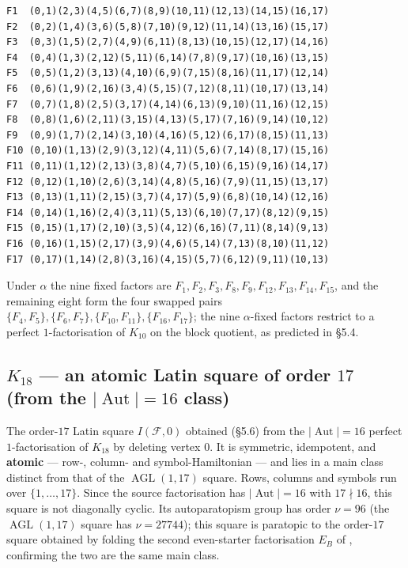\documentclass[11pt,reqno]{amsart}
\theoremstyle{plain}
\theoremstyle{definition}
\numberwithin{theorem}{section}
\newcommand{\Aut}{\operatorname{Aut}}
\newcommand{\AGL}{\operatorname{AGL}}
\begin{document}
{\footnotesize\begin{verbatim}
F1  (0,1)(2,3)(4,5)(6,7)(8,9)(10,11)(12,13)(14,15)(16,17)
F2  (0,2)(1,4)(3,6)(5,8)(7,10)(9,12)(11,14)(13,16)(15,17)
F3  (0,3)(1,5)(2,7)(4,9)(6,11)(8,13)(10,15)(12,17)(14,16)
F4  (0,4)(1,3)(2,12)(5,11)(6,14)(7,8)(9,17)(10,16)(13,15)
F5  (0,5)(1,2)(3,13)(4,10)(6,9)(7,15)(8,16)(11,17)(12,14)
F6  (0,6)(1,9)(2,16)(3,4)(5,15)(7,12)(8,11)(10,17)(13,14)
F7  (0,7)(1,8)(2,5)(3,17)(4,14)(6,13)(9,10)(11,16)(12,15)
F8  (0,8)(1,6)(2,11)(3,15)(4,13)(5,17)(7,16)(9,14)(10,12)
F9  (0,9)(1,7)(2,14)(3,10)(4,16)(5,12)(6,17)(8,15)(11,13)
F10 (0,10)(1,13)(2,9)(3,12)(4,11)(5,6)(7,14)(8,17)(15,16)
F11 (0,11)(1,12)(2,13)(3,8)(4,7)(5,10)(6,15)(9,16)(14,17)
F12 (0,12)(1,10)(2,6)(3,14)(4,8)(5,16)(7,9)(11,15)(13,17)
F13 (0,13)(1,11)(2,15)(3,7)(4,17)(5,9)(6,8)(10,14)(12,16)
F14 (0,14)(1,16)(2,4)(3,11)(5,13)(6,10)(7,17)(8,12)(9,15)
F15 (0,15)(1,17)(2,10)(3,5)(4,12)(6,16)(7,11)(8,14)(9,13)
F16 (0,16)(1,15)(2,17)(3,9)(4,6)(5,14)(7,13)(8,10)(11,12)
F17 (0,17)(1,14)(2,8)(3,16)(4,15)(5,7)(6,12)(9,11)(10,13)
\end{verbatim}}

Under $\alpha$ the nine fixed factors are
$F_1,F_2,F_3,F_8,F_9,F_{12},F_{13},F_{14},F_{15}$, and the remaining eight form the four
swapped pairs $\{F_4,F_5\},\{F_6,F_7\},\{F_{10},F_{11}\},\{F_{16},F_{17}\}$; the nine
$\alpha$-fixed factors restrict to a perfect $1$-factorisation of $K_{10}$ on the block
quotient, as predicted in \S5.4.

\subsection{$K_{18}$ --- an atomic Latin square of order $17$ (from the $|\Aut|=16$ class)}

The order-$17$ Latin square $I(\mathcal F,0)$ obtained (\S5.6) from the $|\Aut|=16$ perfect
$1$-factorisation of $K_{18}$ by deleting vertex $0$. It is symmetric, idempotent, and
\textbf{atomic} --- row-, column- and symbol-Hamiltonian --- and lies in a main class
distinct from that of the $\AGL(1,17)$ square. Rows, columns and symbols run over
$\{1,\dots,17\}$. Since the source factorisation has $|\Aut|=16$ with $17\nmid 16$, this
square is not diagonally cyclic. Its autoparatopism group has order $\nu=96$ (the
$\AGL(1,17)$ square has $\nu=27744$); this square is paratopic to the order-$17$ square
obtained by folding the second even-starter factorisation $E_B$ of
\cite{BryantMaenhautWanless}, confirming the two are the same main class.
\end{document}
